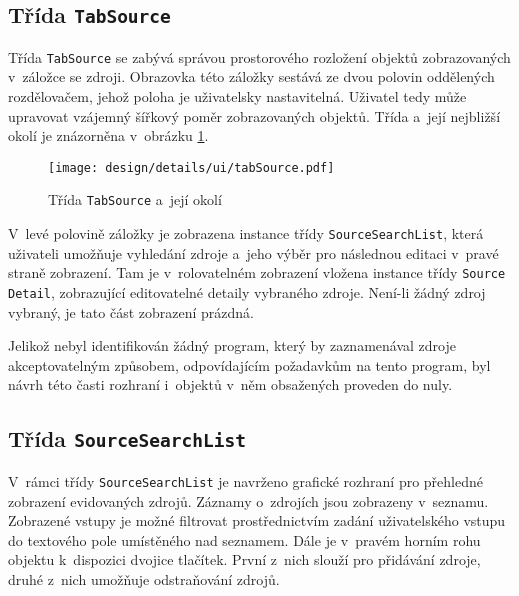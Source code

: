 		\subsection*{Třída \texttt{TabSource}}
		Třída \texttt{TabSource} se zabývá správou prostorového rozložení objektů zobrazovaných v~záložce se zdroji. Obrazovka této záložky sestává ze dvou polovin oddělených rozdělovačem, jehož poloha je uživatelsky nastavitelná. Uživatel tedy může upravovat vzájemný šířkový poměr zobrazovaných objektů. Třída a~její nejbližší okolí je znázorněna v~obrázku \ref{fig:designDetailTabSource}.\par
		\begin{figure}[h]
			\centering
			\texttt{[image: design/details/ui/tabSource.pdf]}
			\caption{Třída \texttt{TabSource} a~její okolí}
			\label{fig:designDetailTabSource}
		\end{figure}
		V~levé polovině záložky je zobrazena instance třídy \texttt{SourceSearchList}, která uživateli umožňuje vyhledání zdroje a~jeho výběr pro následnou editaci v~pravé straně zobrazení. Tam je v~rolovatelném zobrazení vložena instance třídy \texttt{Source Detail}, zobrazující editovatelné detaily vybraného zdroje. Není-li žádný zdroj vybraný, je tato část zobrazení prázdná.\par
		Jelikož nebyl identifikován žádný program, který by zaznamenával zdroje akceptovatelným způsobem, odpovídajícím požadavkům na tento program, byl návrh této časti rozhraní i~objektů v~něm obsažených proveden do nuly. \par
		
		\subsection*{Třída \texttt{SourceSearchList}}
		V~rámci třídy \texttt{SourceSearchList} je navrženo grafické rozhraní pro přehledné zobrazení evidovaných zdrojů. Záznamy o~zdrojích jsou zobrazeny v~seznamu. Zobrazené vstupy je možné filtrovat prostřednictvím zadání uživatelského vstupu do textového pole umístěného nad seznamem. Dále je v~pravém horním rohu objektu k~dispozici dvojice tlačítek. První z~nich slouží pro přidávání zdroje, druhé z~nich umožňuje odstraňování zdrojů. \par
		
